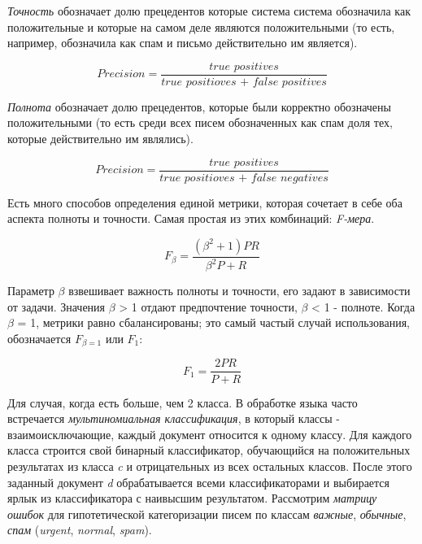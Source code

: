 \documentclass[a4paper,12pt,preview]{report} %
\begin{document}
	 \textit{Точность} обозначает долю прецедентов которые система система обозначила как положительные и которые на самом деле являются положительными (то есть, например, обозначила как спам и письмо действительно им является).
	 
	 \begin{equation}
    	Precision = \dfrac{\textit{true positives}}{\textit{true positioves + false positives}}
	 \end{equation}
	 
	 \textit{Полнота} обозначает долю прецедентов, которые были корректно обозначены положительными (то есть среди всех писем обозначенных как спам доля тех, которые действительно им являлись).
	 
	 \begin{equation}
	 Precision = \dfrac{\textit{true positives}}{\textit{true positioves + false negatives}}
	 \end{equation}
	 
	 Есть много способов определения единой метрики, которая сочетает в себе оба аспекта полноты и точности. Самая простая из этих комбинаций: \textit{F-мера}.
	 
	 \begin{equation}
	 F_\beta = \dfrac{(\beta^2 + 1) P R}{\beta^2 P + R} 
	 \end{equation}
	 
	 Параметр $\beta$ взвешивает важность полноты и точности, его задают в зависимости от задачи. Значения $\beta$ > 1 отдают предпочтение точности, $\beta$ < 1 - полноте. Когда $\beta$ = 1, метрики равно сбалансированы; это самый частый случай использования, обозначается $F_{\beta = 1}$ или $F_1$: 
	 
	 \begin{equation}
	 F_1 = \dfrac{2PR}{P + R}
	 \end{equation}
	 
	 
	 Для случая, когда есть больше, чем 2 класса.
	 В обработке языка часто встречается \textit{мультиномиальная классификация}, в который классы - взаимоисключающие, каждый документ относится к одному классу. Для каждого класса строится свой бинарный классификатор, обучающийся на положительных результатах из класса \textit{c} и отрицательных из всех остальных классов. После этого заданный документ \textit{d} обрабатывается всеми классификаторами и выбирается ярлык из классификатора с наивысшим результатом. Рассмотрим \textit{матрицу ошибок} для гипотетической категоризации писем по классам \textit{важные}, \textit{обычные}, \textit{спам} (\textit{urgent}, \textit{normal}, \textit{spam}).
	 
\end{document}
